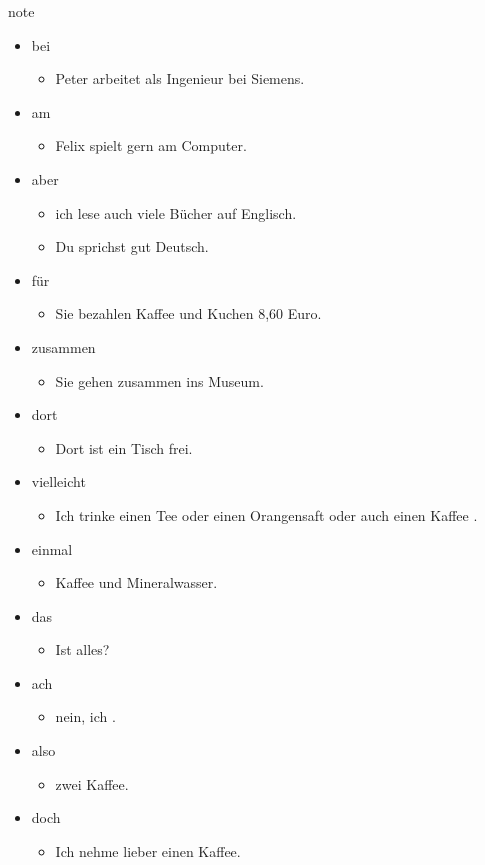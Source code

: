 \begin{syntax}{note}{}
\begin{itemize}
	\item bei \begin{itemize}
		\item Peter arbeitet als Ingenieur bei Siemens.
	\end{itemize}
	\item am \begin{itemize}
		\item Felix spielt gern am Computer.
	\end{itemize}
	\item aber \begin{itemize}
			\item {} ich lese auch viele Bücher auf Englisch.
			\item Du sprichst  gut Deutsch.
	\end{itemize}
	\item für \begin{itemize}
			\item Sie bezahlen  Kaffee und Kuchen 8,60 Euro.
	\end{itemize}
	\item zusammen \begin{itemize}
			\item Sie gehen zusammen ins Museum.
	\end{itemize}
	\item dort \begin{itemize}
			\item Dort ist ein Tisch frei.
	\end{itemize}
	\item vielleicht \begin{itemize}
			\item Ich trinke  einen Tee oder einen Orangensaft oder  auch einen Kaffee \fillhere .
	\end{itemize}
	\item einmal \begin{itemize}
			\item {} Kaffee und  Mineralwasser.
	\end{itemize}
	\item das \begin{itemize}
			\item Ist  alles?
	\end{itemize}
	\item ach \begin{itemize}
			\item {} nein, ich \fillhere .
	\end{itemize}
	\item also \begin{itemize}
			\item {} zwei Kaffee.
	\end{itemize}
	\item doch \begin{itemize}
			\item Ich nehme  lieber einen Kaffee.
	\end{itemize}
\end{itemize}
\end{syntax}
